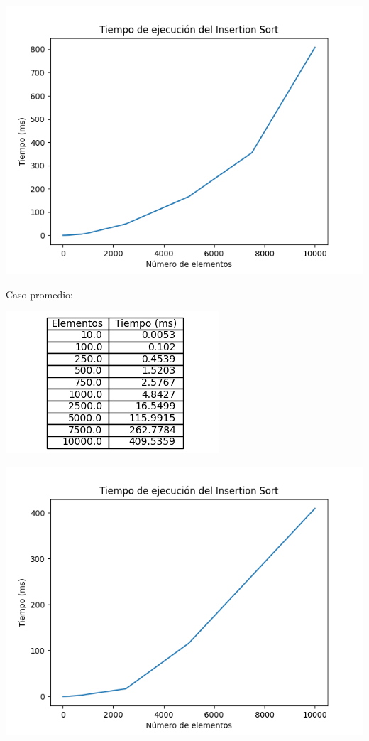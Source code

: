 \documentclass[14pt,a4paper]{report}
\begin{document}
\begin{center}
\includegraphics[scale=1]{../grafica-insertion-worst.png} 
\end{center}
\newpage
Caso promedio:
\begin{center}
\includegraphics[scale=1]{../tabla-insertion-mean.png}  
\end{center}
\begin{center}
\includegraphics[scale=1]{../grafica-insertion-mean.png} 
\end{center}
\newpage
\end{document}

